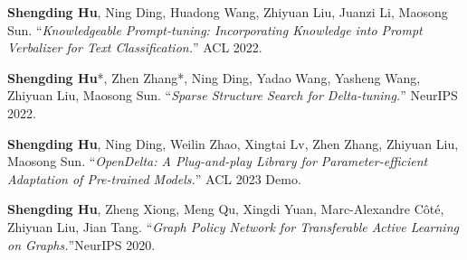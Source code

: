 \begin{resume}
\begin{achievements}
        \item \textbf{Shengding Hu}, Ning Ding, Huadong Wang, Zhiyuan Liu, Juanzi Li, Maosong Sun. ``\textit{Knowledgeable Prompt-tuning: Incorporating Knowledge into Prompt Verbalizer for Text Classification.}'' ACL 2022.
      
        \item \textbf{Shengding Hu}*, Zhen Zhang*, Ning Ding, Yadao Wang, Yasheng Wang, Zhiyuan Liu, Maosong Sun. ``\textit{Sparse Structure Search for Delta-tuning.}'' NeurIPS 2022.
        
        \item \textbf{Shengding Hu}, Ning Ding, Weilin Zhao, Xingtai Lv, Zhen Zhang, Zhiyuan Liu, Maosong Sun. ``\textit{OpenDelta: A Plug-and-play Library for Parameter-efficient Adaptation of Pre-trained Models.}'' ACL 2023 Demo.
        \item \textbf{Shengding Hu}, Zheng Xiong, Meng Qu, Xingdi Yuan, Marc-Alexandre Côté, Zhiyuan Liu, Jian Tang. ``\textit{Graph Policy Network for Transferable Active Learning on Graphs.}''NeurIPS 2020.
  

\end{achievements}
\end{resume}

